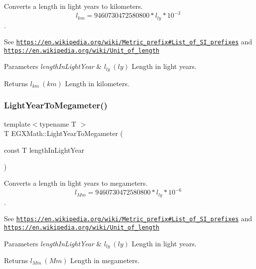 Converts a length in light years to kilometers. \[ l_{km}=9460730472580800 * l_{ly} * 10^{-3} \]. 

See \href{https://en.wikipedia.org/wiki/Metric_prefix#List_of_SI_prefixes}{\tt https\+://en.\+wikipedia.\+org/wiki/\+Metric\+\_\+prefix\#\+List\+\_\+of\+\_\+\+S\+I\+\_\+prefixes} and \href{https://en.wikipedia.org/wiki/Unit_of_length}{\tt https\+://en.\+wikipedia.\+org/wiki/\+Unit\+\_\+of\+\_\+length} 
\begin{DoxyParams}{Parameters}
{\em length\+In\+Light\+Year} & $ l_{ly}\ (ly)$ Length in light years. \\
\hline
\end{DoxyParams}
\begin{DoxyReturn}{Returns}
$ l_{km}\ (km)$ Length in kilometers. 
\end{DoxyReturn}
\mbox{\label{group___e_g_x_math-_conversions-_length_conversions-_astronomical-_light_year-_s_i_ga55603d7948429b49c2942b228c1376ed}} 
\subsubsection{\texorpdfstring{Light\+Year\+To\+Megameter()}{LightYearToMegameter()}}
{\footnotesize\ttfamily template$<$typename T $>$ \\
T E\+G\+X\+Math\+::\+Light\+Year\+To\+Megameter (\begin{DoxyParamCaption}\item[{const T}]{length\+In\+Light\+Year }\end{DoxyParamCaption})}



Converts a length in light years to megameters. \[ l_{Mm}=9460730472580800 * l_{ly} * 10^{-6} \]. 

See \href{https://en.wikipedia.org/wiki/Metric_prefix#List_of_SI_prefixes}{\tt https\+://en.\+wikipedia.\+org/wiki/\+Metric\+\_\+prefix\#\+List\+\_\+of\+\_\+\+S\+I\+\_\+prefixes} and \href{https://en.wikipedia.org/wiki/Unit_of_length}{\tt https\+://en.\+wikipedia.\+org/wiki/\+Unit\+\_\+of\+\_\+length} 
\begin{DoxyParams}{Parameters}
{\em length\+In\+Light\+Year} & $ l_{ly}\ (ly)$ Length in light years. \\
\hline
\end{DoxyParams}
\begin{DoxyReturn}{Returns}
$ l_{Mm}\ (Mm)$ Length in megameters. 
\end{DoxyReturn}
\mbox{\label{group___e_g_x_math-_conversions-_length_conversions-_astronomical-_light_year-_s_i_ga5475c14ecdd1c3379e891342591cc8e2}} 
